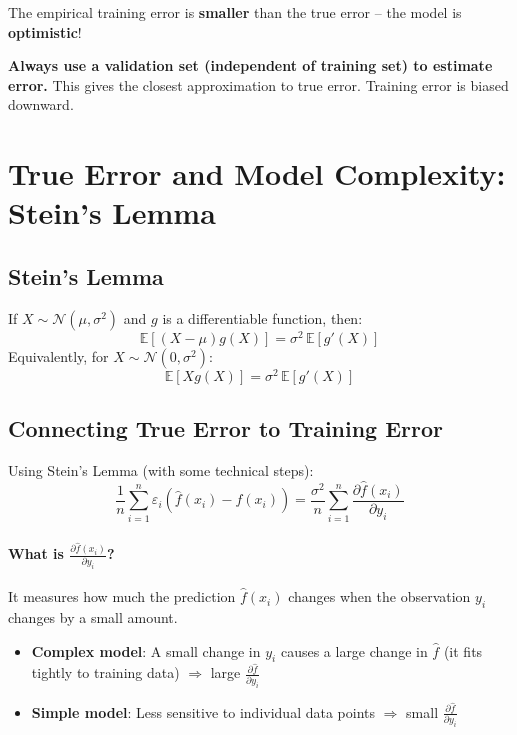 \documentclass[12pt,a4paper]{article}
\newcommand{\E}{\mathbb{E}}
\begin{document}
The empirical training error is \textbf{smaller} than the true error -- the model is \textbf{optimistic}!

\begin{alertbox}
\textbf{Always use a validation set (independent of training set) to estimate error.} This gives the closest approximation to true error. Training error is biased downward.
\end{alertbox}

\section{True Error and Model Complexity: Stein's Lemma}

\subsection{Stein's Lemma}

\begin{theorembox}[title={Stein's Lemma}]
If $X \sim \mathcal{N}(\mu, \sigma^2)$ and $g$ is a differentiable function, then:
\[
  \E[(X-\mu)g(X)] = \sigma^2\,\E[g'(X)]
\]
Equivalently, for $X \sim \mathcal{N}(0, \sigma^2)$:
\[
  \E[Xg(X)] = \sigma^2\,\E[g'(X)]
\]
\end{theorembox}

\subsection{Connecting True Error to Training Error}

Using Stein's Lemma (with some technical steps):
\[
  \frac{1}{n}\sum_{i=1}^{n}\varepsilon_i(\hat{f}(x_i) - f(x_i))
  = \frac{\sigma^2}{n}\sum_{i=1}^{n}\frac{\partial\hat{f}(x_i)}{\partial y_i}
\]

\paragraph{What is $\frac{\partial\hat{f}(x_i)}{\partial y_i}$?} It measures how much the prediction $\hat{f}(x_i)$ changes when the observation $y_i$ changes by a small amount.

\begin{itemize}
  \item \textbf{Complex model}: A small change in $y_i$ causes a large change in $\hat{f}$ (it fits tightly to training data) $\Rightarrow$ large $\frac{\partial\hat{f}}{\partial y_i}$
  \item \textbf{Simple model}: Less sensitive to individual data points $\Rightarrow$ small $\frac{\partial\hat{f}}{\partial y_i}$
\end{itemize}
\end{document}
